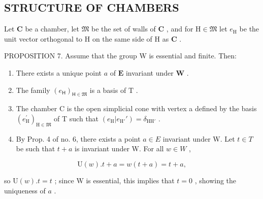 \subsection{STRUCTURE OF CHAMBERS}

Let \(\mathbf{C}\) be a chamber, let \(\mathfrak{M}\) be the set of walls of \(\mathbf{C}\) , and for \(\mathrm{H} \in \mathfrak{M}\) let \(e_{\mathrm{H}}\) be the unit vector orthogonal to \(\mathrm{H}\) on the same side of \(\mathrm{H}\) as \(\mathbf{C}\) .

PROPOSITION 7. Assume that the group W is essential and finite. Then:

\begin{enumerate}
\def\labelenumi{(\roman{enumi})}
\item
  There exists a unique point \(a\) of \(\mathbf{E}\) invariant under \(\mathbf{W}\) .
\item
  The family \((e_{\mathsf{H}})_{\mathsf{H}\in \mathfrak{M}}\) is a basis of \(\mathrm{T}\) .
\item
  The chamber C is the open simplicial cone with vertex a defined by the basis \((e_{\mathrm{H}}^{\prime})_{\mathrm{H}\in \mathfrak{M}}\) of T such that \((e_{\mathrm{H}}|e_{\mathrm{H}'}') = \delta_{\mathrm{HH}'}\) .
\item
  By Prop. 4 of no. 6, there exists a point \(a \in E\) invariant under W. Let \(t \in T\) be such that \(t + a\) is invariant under W. For all \(w \in W\) ,
\end{enumerate}

\[
\mathrm{U} (w). t + a = w (t + a) = t + a,
\]

so \(\mathrm{U}(w).t = t\) ; since \(\mathrm{W}\) is essential, this implies that \(t = 0\) , showing the uniqueness of \(a\) .

